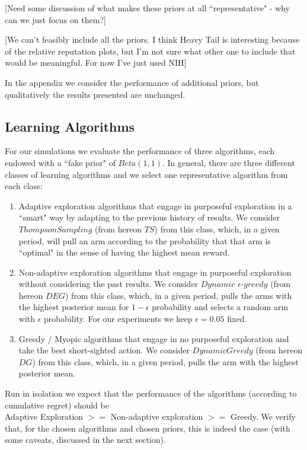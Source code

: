 \documentclass{article}
\theoremstyle{definition}
\begin{document}
[Need some discussion of what makes these priors at all ``representative" - why can we just focus on them?]

[We can't feasibly include all the priors. I think Heavy Tail is interesting because of the relative reputation plots, but I'm not sure what other one to include that would be meaningful. For now I've just used NIH]

In the appendix we consider the performance of additional priors, but qualitatively the results presented are unchanged.

\subsection{Learning Algorithms}

For our simulations we evaluate the performance of three algorithms, each endowed with a ``fake prior" of $Beta(1, 1)$. In general, there are three different classes of learning algorithms and we select one representative algorithm from each class: 
\begin{enumerate}
\item Adaptive exploration algorithms that engage in purposeful exploration in a ``smart" way by adapting to the previous history of results. We consider $Thompson Sampling$ (from hereon $TS$) from this class, which, in a given period, will pull an arm according to the probability that that arm is ``optimal" in the sense of having the highest mean reward.
\item Non-adaptive exploration algorithms that engage in purposeful exploration without considering the past results. We consider $Dynamic$ $\epsilon$-$greedy$ (from hereon $DEG$) from this class, which, in a given period, pulls the arms with the highest posterior mean for $1 - \epsilon$ probability and selects a random arm with $\epsilon$ probability. For our experiments we keep $\epsilon = 0.05$ fixed.
\item Greedy / Myopic algorithms that engage in no purposeful exploration and take the best short-sighted action. We consider $DynamicGreedy$ (from hereon $DG$) from this class, which, in a given period, pulls the arm with the highest posterior mean.
\end{enumerate}

Run in isolation we expect that the performance of the algorithms (according to cumulative regret) should be \\
 Adaptive Exploration $>=$ Non-adaptive exploration $>=$ Greedy. We verify that, for the chosen algorithms and chosen priors, this is indeed the case (with some caveats, discussed in the next section).
\end{document}
